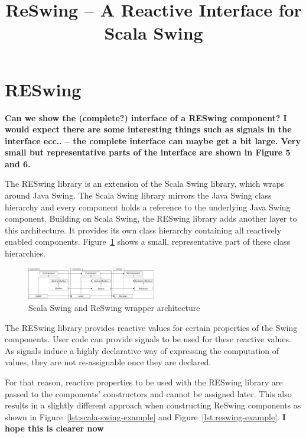 \documentclass{scrartcl}
\title{ReSwing -- A Reactive Interface for Scala Swing}
\author{}
\date{}
\begin{document}
\maketitle






\section{RESwing}

{\bf Can we show the (complete?) interface of a RESwing component? I
  would expect there are some interesting things such as signals in
  the interface ecc.. -- the complete interface can maybe get a bit
  large. Very small but representative parts of the interface are
  shown in Figure 5 and 6.}

The RESwing library is an extension of the Scala Swing library, which
wraps around Java Swing. The Scala Swing library mirrors the Java
Swing class hierarchy and every component holds a reference to the
underlying Java Swing component. Building on Scala Swing, the RESwing
library adds another layer to this architecture. It provides its own
class hierarchy containing all reactively enabled
components. Figure~\ref{fig:overview} shows a small, representative
part of these class hierarchies.

\begin{figure}[htp]
  \centering
  \includegraphics[width=0.5\textwidth]{images/overview}
  \caption{Scala Swing and ReSwing wrapper architecture}
  \label{fig:overview}
\end{figure}

The RESwing library provides reactive values for certain  properties
of the Swing components. User code can provide signals to be used for
these reactive values. As signals induce a highly declarative way of
expressing the computation of values, they are not re-assignable once
they are declared.

For that reason, reactive properties to be used with the RESwing
library are passed to the components' constructors and cannot be
assigned later. This also results in a slightly different approach
when constructing ReSwing components as shown in
Figure~\ref{lst:scala-swing-example} and
Figure~\ref{lst:reswing-example}.
{\bf I hope this is clearer now}
\end{document}

